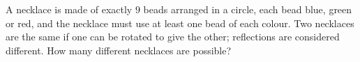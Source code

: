 A necklace is made of exactly $9$ beads arranged in a circle, each bead blue, green or red, and the necklace must use at least one bead of each colour. Two necklaces are the same if one can be rotated to give the other; reflections are considered different. How many different necklaces are possible?

